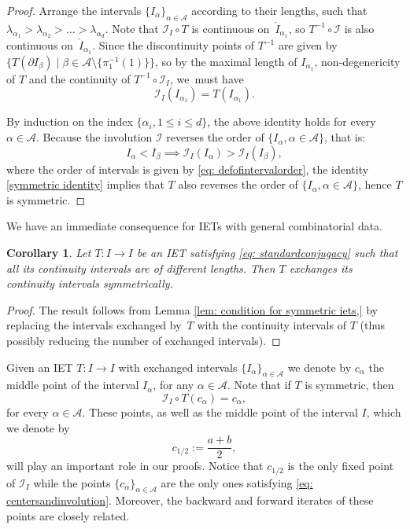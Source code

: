 \documentclass[10pt,a4paper]{amsart}
\theoremstyle{plain}
\newtheorem{corollary}[theorem]{Corollary}
\theoremstyle{definition}
\newcommand{\A}{\mathcal{A}}
\newcommand{\I}{\mathcal{I}}
\begin{document}
\begin{proof}
Arrange the intervals $\{I_{\alpha}\}_{\alpha\in \A}$ according to their lengths, such that $\lambda_{\alpha_1}>\lambda_{\alpha_2}>\dots> \lambda_{\alpha_d}$.
Note that $\I_I\circ T$ is continuous on~$\mathring I_{\alpha_1}$, so $T^{-1}\circ \I$ is also continuous on~$\mathring I_{\alpha_1}$. Since the discontinuity points of $T^{-1}$ are given by $\{T(\partial I_{\beta}) \mid \beta\in \A {\setminus \{\pi_1^{-1}(1)\}}\}$, so by the maximal length of $I_{\alpha_1}$, non-degenericity of $T$ and the continuity of $T^{-1}\circ \I_I$, we~must have
\begin{equation}\label{symmetric identity}
\I_I(I_{\alpha_1})=T(I_{\alpha_1}).
\end{equation}

By induction on the index $\{\alpha_i, 1\le i\le d\}$, the above identity holds for every $\alpha \in \A$. Because the involution $\I$ reverses the order of $\{I_{\alpha}, \alpha \in \A\}$, that is:
\[
I_{\alpha}<I_{\beta}\implies \I_I(I_{\alpha})>\I_I(I_{\beta}),
\]
{where the order of intervals is given by \eqref{eq: defofintervalorder}, }the identity \eqref{symmetric identity} implies that $T$ also reverses the order of $\{I_{\alpha}, \alpha \in \A\}$, hence $T$ is symmetric.
\end{proof}
We have an immediate consequence for IETs with general combinatorial data.
\begin{corollary}\label{cor: symmetricintcont}
Let $T: I \to I$ be an IET satisfying \eqref{eq: standardconjugacy} such that all its continuity intervals are of different lengths. Then $T$ exchanges its continuity intervals symmetrically.
\end{corollary}

\begin{proof}
The result follows from Lemma \ref{lem: condition for symmetric iets,} by replacing the intervals exchanged by~$T$ with the continuity intervals of $T$ (thus possibly reducing the number of exchanged intervals).
\end{proof}

Given an IET $T: I \to I$ with exchanged intervals $\{I_{\alpha}\}_{\alpha \in \A}$ we denote by $c_{\alpha}$ the middle point of the interval $I_\alpha$, for any $\alpha\in\A$. Note that if $T$ is symmetric, then\vspace*{-3pt}
\begin{equation}\label{eq: centersandinvolution}
\mathcal{I}_I\circ T(c_{\alpha})=c_{\alpha},
\end{equation}
for every $\alpha\in\A$. These points, as well as the middle point of the interval $I$, which we denote by\vspace*{-3pt}
\[
c_{1/2} := \frac{a + b}{2},
\]
will play an important role in our proofs. Notice that $c_{1/2}$ is the only fixed point of $\I_I$ while the points $\{c_{\alpha}\}_{\alpha\in\A}$ are the only ones satisfying
\eqref{eq: centersandinvolution}. Moreover, the backward and forward
iterates of these points are closely related.
\end{document}
